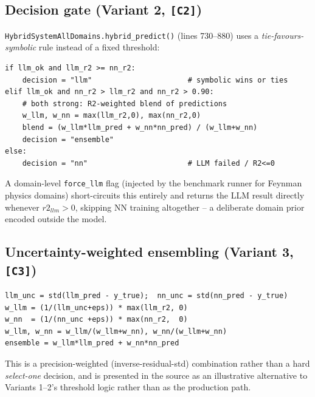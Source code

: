 \documentclass[11pt,a4paper]{article}
\newcommand{\code}[1]{\texttt{\small #1}}
\begin{document}
\subsection{Decision gate (Variant 2, \code{[C2]})}
\code{HybridSystemAllDomains.hybrid\_predict()} (lines 730--880) uses a
\emph{tie-favours-symbolic} rule instead of a fixed threshold:

\begin{lstlisting}[caption={Decision branch, \code{hybrid\_system\_llm\_nn\_all\_domains.py} (abridged, original code)}]
if llm_ok and llm_r2 >= nn_r2:
    decision = "llm"                      # symbolic wins or ties
elif llm_ok and nn_r2 > llm_r2 and nn_r2 > 0.90:
    # both strong: R2-weighted blend of predictions
    w_llm, w_nn = max(llm_r2,0), max(nn_r2,0)
    blend = (w_llm*llm_pred + w_nn*nn_pred) / (w_llm+w_nn)
    decision = "ensemble"
else:
    decision = "nn"                       # LLM failed / R2<=0
\end{lstlisting}

A domain-level \code{force\_llm} flag (injected by the benchmark runner for
Feynman physics domains) short-circuits this entirely and returns the LLM
result directly whenever $r2_{llm}>0$, skipping NN training altogether --
a deliberate domain prior encoded outside the model.

\subsection{Uncertainty-weighted ensembling (Variant 3, \code{[C3]})}
\begin{lstlisting}[caption={\code{ensemble\_llm\_nn()}, \code{hybrid\_ensemble\_system\_defi\_domain.py} (original code, condensed)}]
llm_unc = std(llm_pred - y_true);  nn_unc = std(nn_pred - y_true)
w_llm = (1/(llm_unc+eps)) * max(llm_r2, 0)
w_nn  = (1/(nn_unc +eps)) * max(nn_r2,  0)
w_llm, w_nn = w_llm/(w_llm+w_nn), w_nn/(w_llm+w_nn)
ensemble = w_llm*llm_pred + w_nn*nn_pred
\end{lstlisting}
This is a precision-weighted (inverse-residual-std) combination rather than
a hard \emph{select-one} decision, and is presented in the source as an
illustrative alternative to Variants 1--2's threshold logic rather than as
the production path.
\end{document}
